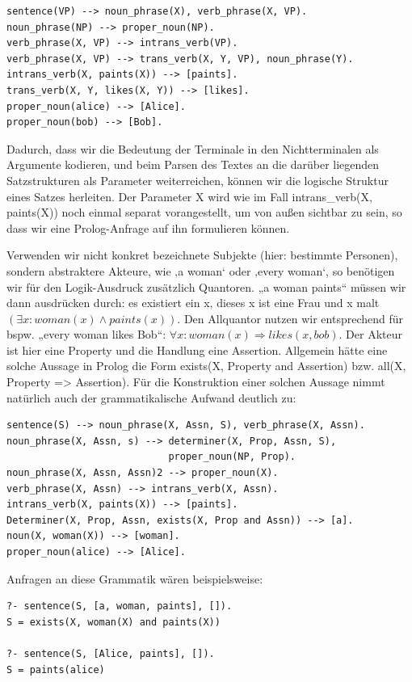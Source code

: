 \begin{verbatim}
sentence(VP) --> noun_phrase(X), verb_phrase(X, VP).
noun­_phrase(NP) --> proper_noun(NP).
verb_phrase(X, VP) --> intrans_verb(VP).
verb_phrase(X, VP) --> trans_verb(X, Y, VP), noun_phrase(Y).
intrans_verb(X, paints(X)) --> [paints].
trans_verb(X, Y, likes(X, Y)) --> [likes].
proper_noun(alice) --> [Alice].
proper_noun(bob) --> [Bob].
\end{verbatim}

Dadurch, dass wir die Bedeutung der Terminale in den Nichtterminalen als Argumente kodieren, und beim Parsen des Textes an die darüber liegenden Satzstrukturen als Parameter weiterreichen, können wir die logische Struktur eines Satzes herleiten.
Der Parameter X wird wie im Fall intrans\_verb(X, paints(X)) noch einmal separat vorangestellt, um von außen sichtbar zu sein, so dass wir eine Prolog-Anfrage auf ihn formulieren können.

Verwenden wir nicht konkret bezeichnete Subjekte (hier: bestimmte Personen), sondern abstraktere Akteure, wie ‚a woman‘ oder ‚every woman‘, so benötigen wir für den Logik-Ausdruck zusätzlich Quantoren.
„a woman paints“ müssen wir dann ausdrücken durch: es existiert ein x, dieses x ist eine Frau und x malt $(\exists x: woman(x) \wedge paints(x))$.
Den Allquantor nutzen wir entsprechend für bspw.
„every woman likes Bob“: $\forall x: woman(x) \Rightarrow likes(x, bob)$.
Der Akteur ist hier eine Property und die Handlung eine Assertion.
Allgemein hätte eine solche Aussage in Prolog die Form exists(X, Property and Assertion) bzw.
all(X, Property => Assertion).
Für die Konstruktion einer solchen Aussage nimmt natürlich auch der grammatikalische Aufwand deutlich zu:

\begin{verbatim}
sentence(S) --> noun_phrase(X, Assn, S), verb_phrase(X, Assn).
noun­_phrase(X, Assn, s) --> determiner(X, Prop, Assn, S),
                            proper_noun(NP, Prop).
noun­_phrase(X, Assn, Assn)2 --> proper_noun(X).
verb_phrase(X, Assn) --> intrans_verb(X, Assn).
intrans_verb(X, paints(X)) --> [paints].
Determiner(X, Prop, Assn, exists(X, Prop and Assn)) --> [a].
noun(X, woman(X)) --> [woman].
proper_noun(alice) --> [Alice].
\end{verbatim}

Anfragen an diese Grammatik wären beispielsweise:
\begin{verbatim}
?- sentence(S, [a, woman, paints], []).
S = exists(X, woman(X) and paints(X))

?- sentence(S, [Alice, paints], []).
S = paints(alice)
\end{verbatim}

